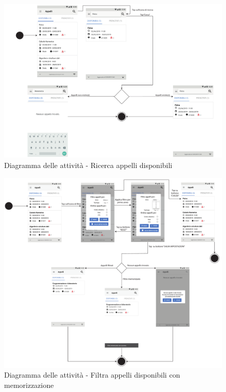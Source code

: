 \begin{figure}
	\centering
	\includegraphics[width=6in]{imgs/gruppo1/activity_diagrams/AD8_Ricerca_appelli.pdf}
	\caption{Diagramma delle attività - Ricerca appelli disponibili}
	\label{diag:ricercaAppelliDisponibiliAD}
\end{figure}
\newpage

\begin{figure}
	\centering
	\includegraphics[width=6in]{imgs/gruppo1/activity_diagrams/AD9_filtra_appelli.pdf}
	\caption{Diagramma delle attività - Filtra appelli disponibili con memorizzazione}
	\label{diag:filtraAppelliDisponibiliConMemAD}
\end{figure}
\newpage

